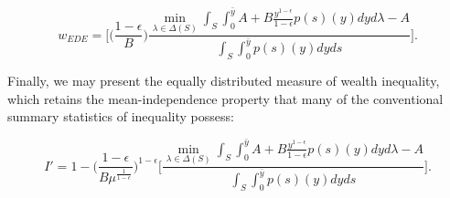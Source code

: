 \documentclass[\econtexRoot/IneqMeas]{subfiles}
\begin{document}
$$ w_{EDE} = \bigg[ \bigg(\frac{1-\epsilon}{B}\bigg) \frac{\min_{\lambda \in \Delta(S)}  \int_{S} \int_{0}^{\bar{y}} A + B \frac{y^{1-\epsilon}}{1-\epsilon} p(s)(y) dy d\lambda - A   }{\int_S \int_{0}^{\bar{y}} p(s)(y) dy ds } \bigg]. $$

\par Finally, we may present the equally distributed measure of wealth inequality, which retains the mean-independence property that many of the conventional summary statistics of inequality possess:

$$ I' = 1 - \bigg( \frac{1 - \epsilon}{B \mu^{\frac{1}{1-\epsilon}}} \bigg)^{1-\epsilon}  \bigg[ \frac{\min_{\lambda \in \Delta(S)}  \int_{S} \int_{0}^{\bar{y}} A + B \frac{y^{1-\epsilon}}{1-\epsilon} p(s)(y) dy d\lambda - A   }{\int_S \int_{0}^{\bar{y}} p(s)(y) dy ds } \bigg].$$


\onlyinsubfile{}

\end{document}
